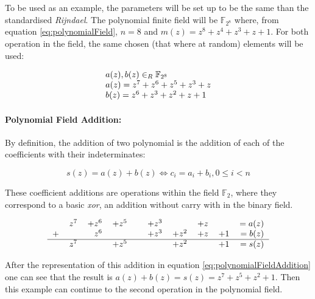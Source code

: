 \documentclass[10pt,a4paper,twoside]{llncs}
\newcommand{\rijndael}{\emph{Rijndael}}
\newcommand{\Fpn}[2]{\ensuremath{\mathbb{F}_{#1^#2}}}
\begin{document}
To be used as an example, the parameters will be set up to be the same than the standardised \rijndael. The polynomial finite field will be $\Fpn{2}{8}$ where, from equation \ref{eq:polynomialField}, $n=8$ and $m(z)=z^8+z^4+z^3+z+1$. For both operation in the field, the same chosen (that where at random) elements will be used:

\begin{equation}\label{eq:randomPolynomialField}
 \begin{tabular}{l}
  $a(z), b(z) \in_R \Fpn{2}{8}$\\
  $a(z)=z^7+z^6+z^5+z^3+z$\\
  $b(z)=z^6+z^3+z^2+z+1$\\
 \end{tabular}
\end{equation}

\paragraph*{Polynomial Field Addition:}

By definition, the addition of two polynomial is the addition of each of the coefficients with their indeterminates:

\begin{equation}\label{def:polynomialFieldAddition}
 s(z)=a(z)+b(z) \Leftrightarrow c_i = a_i + b_i, 0\leqslant i < n
\end{equation}

These coefficient additions are operations within the field $\mathbb{F}_{2}$, where they correspond to a basic \emph{xor}, an addition without carry with in the binary field.

\begin{equation}\label{eq:polynomialFieldAddition}
 \begin{tabular}{rrrrrrrrrrrrr}
      &$z^7$&$+z^6$&$+z^5$&      &$+z^3$&      &$+z$&    &$=a(z)$\\
   $+$&     &$ z^6$&      &      &$+z^3$&$+z^2$&$+z$&$+1$&$=b(z)$\\
   \hline
      &$z^7$&      &$+z^5$&      &      &$+z^2$&    &$+1$&$=s(z)$\\
 \end{tabular}
\end{equation}

After the representation of this addition in equation \ref{eq:polynomialFieldAddition} one can see that the result is $a(z)+b(z)=s(z)=z^7+z^5+z^2+1$. Then this example can continue to the second operation in the polynomial field.
\end{document}
